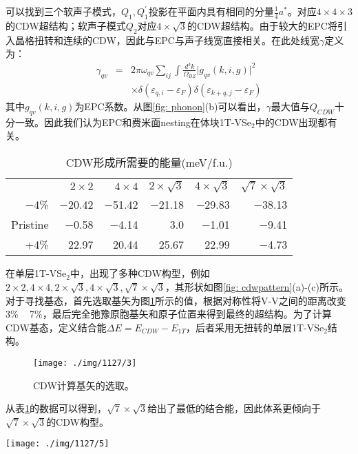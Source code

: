\documentclass[reprint, aps, prb, showkeys]{revtex4-2}
\begin{document}
可以找到三个软声子模式，$Q_1, Q_1^{'}$投影在平面内具有相同的分量$\frac{1}{4}a^{*}$。对应$4 \times 4 \times 3$的CDW超结构；软声子模式$Q_2$对应$4 \times \sqrt{3}$的CDW超结构。由于较大的EPC将引入晶格扭转和连续的CDW，因此与EPC与声子线宽直接相关。在此处线宽$\gamma$定义为：
\begin{eqnarray}
    \gamma_{qv} &=& 2\pi\omega_{qv} \sum_{ij} \int{\frac{d^3k}{\Omega_{BZ}} | g_{qv}(k, i, g) \vert^2 } \nonumber \\
    && \times \delta(\varepsilon_{q,i} - \varepsilon_F) \delta(\varepsilon_{k+q, j} - \varepsilon_F)
\end{eqnarray}
其中$g_{qv}(k, i, g)$为EPC系数。从图\ref{fig: phonon}(b)可以看出，$\gamma$最大值与$Q_{CDW}$十分一致。因此我们认为EPC和费米面nesting在体块1T-VSe$_2$中的CDW出现都有关。
\begin{table}[t]
    \caption{\label{Tab:cdw energy} CDW形成所需要的能量(meV/f.u.)} 
\begin{ruledtabular}
    \begin{tabular}{rrrrrr}
    \textrm{}&
    \textrm{$2 \times 2$}&
    \textrm{$4 \times 4$}&
    \textrm{$2 \times \sqrt{3}$}&
    \textrm{$4 \times \sqrt{3}$}&
    \textrm{$\sqrt{7} \times \sqrt{3}$}\\
    −4\%      &   −20.42  &  −51.42 & −21.18 & −29.83 & −38.13 \\
    Pristine  &   −0.58   &  −4.14  & 3.0    & −1.01  & −9.41  \\
    +4\%      &    22.97  &  20.44  & 25.67  & 22.99  & −4.73 
    \end{tabular}
\end{ruledtabular}
\end{table}
在单层1T-VSe$_2$中，出现了多种CDW构型，例如$2 \times 2, 4 \times 4, 2 \times \sqrt{3}, 4 \times \sqrt{3}, \sqrt{7} \times \sqrt{3}$，其形状如图\ref{fig: cdwpattern}(a)-(c)所示。对于寻找基态，首先选取基矢为图\ref{fig: vector}所示的值，根据对称性将V-V之间的距离改变3\% ~ 7\%，最后完全弛豫原胞基矢和原子位置来得到最终的超结构。为了计算CDW基态，定义结合能${\Delta}E = E_{CDW} - E_{1T}$，后者采用无扭转的单层1T-VSe$_2$结构。
\begin{figure}[t]
    \texttt{[image: ./img/1127/3]}
    \caption{\label{fig: vector} 
    CDW计算基矢的选取。
    }
\end{figure}
从表\ref{Tab:cdw energy}的数据可以得到，$\sqrt{7} \times \sqrt{3}$给出了最低的结合能，因此体系更倾向于$\sqrt{7} \times \sqrt{3}$的CDW构型。
\begin{figure*}[t]
    \texttt{[image: ./img/1127/5]}
    \caption{\label{fig: cdwpattern} 
    (a)$2 \times \sqrt{3}$，(b)$\sqrt{7} \times \sqrt{3}$，(c)$4 \times 4$ CDW构型；(d)在不同压力下CDW超结构的能量增益(Energy gain)。
    }
\end{figure*}
\end{document}

